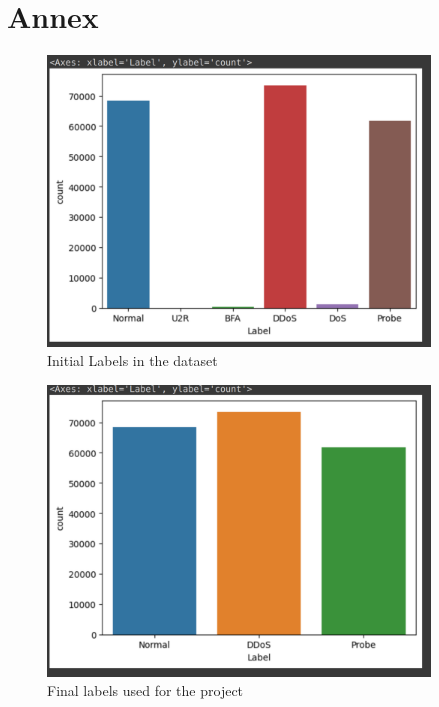 \chapter{Annex}
\begin{figure}[tbh] %
	\begin{center}
		\includegraphics[width=4in]{images/labelsBefore.png} 
		\caption{Initial Labels in the dataset} %
		\label{Initial Labels in the dataset} 
	\end{center}
\end{figure}
\begin{figure}[tbh]
	\begin{center}
		\includegraphics[width=4in]{images/labelsAfter.png}
		\caption{Final labels used for the project }
		\label{Final labels used for the project}
	\end{center}
\end{figure}
